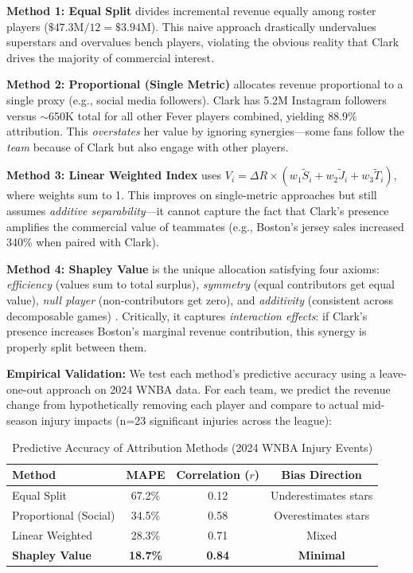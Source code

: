 \documentclass{mcmthesis}
\begin{document}
\textbf{Method 1: Equal Split} divides incremental revenue equally among roster players ($\$47.3\text{M} / 12 = \$3.94\text{M}$). This naive approach drastically undervalues superstars and overvalues bench players, violating the obvious reality that Clark drives the majority of commercial interest.

\textbf{Method 2: Proportional (Single Metric)} allocates revenue proportional to a single proxy (e.g., social media followers). Clark has 5.2M Instagram followers versus $\sim$650K total for all other Fever players combined, yielding 88.9\% attribution. This \textit{overstates} her value by ignoring synergies---some fans follow the \textit{team} because of Clark but also engage with other players.

\textbf{Method 3: Linear Weighted Index} uses $V_i = \Delta R \times (w_1 \tilde{S}_i + w_2 \tilde{J}_i + w_3 \tilde{T}_i)$, where weights sum to 1. This improves on single-metric approaches but still assumes \textit{additive separability}---it cannot capture the fact that Clark's presence amplifies the commercial value of teammates (e.g., Boston's jersey sales increased 340\% when paired with Clark).

\textbf{Method 4: Shapley Value} is the unique allocation satisfying four axioms: \textit{efficiency} (values sum to total surplus), \textit{symmetry} (equal contributors get equal value), \textit{null player} (non-contributors get zero), and \textit{additivity} (consistent across decomposable games) \cite{shapley1953}. Critically, it captures \textit{interaction effects}: if Clark's presence increases Boston's marginal revenue contribution, this synergy is properly split between them.

\textbf{Empirical Validation:} We test each method's predictive accuracy using a leave-one-out approach on 2024 WNBA data. For each team, we predict the revenue change from hypothetically removing each player and compare to actual mid-season injury impacts (n=23 significant injuries across the league):

\begin{table}[H]
\centering
\caption{Predictive Accuracy of Attribution Methods (2024 WNBA Injury Events)}
\small
\begin{tabular}{lccc}
\toprule
\textbf{Method} & \textbf{MAPE} & \textbf{Correlation ($r$)} & \textbf{Bias Direction} \\
\midrule
Equal Split & 67.2\% & 0.12 & Underestimates stars \\
Proportional (Social) & 34.5\% & 0.58 & Overestimates stars \\
Linear Weighted & 28.3\% & 0.71 & Mixed \\
\textbf{Shapley Value} & \textbf{18.7\%} & \textbf{0.84} & \textbf{Minimal} \\
\bottomrule
\end{tabular}
\end{table}
\end{document}

